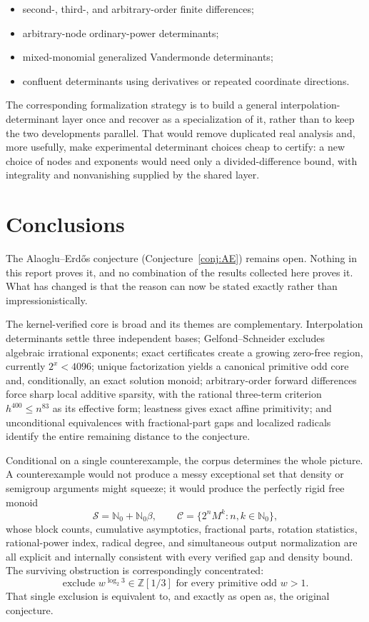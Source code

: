 \documentclass[11pt,oneside]{article}
\theoremstyle{definition}
\theoremstyle{remark}
\newcommand{\Nzero}{\mathbb N_0}
\newcommand{\Z}{\mathbb Z}
\newcommand{\Sol}{\mathcal S}
\newcommand{\Cand}{\mathcal C}
\newcommand{\Zthree}{\Z[1/3]}
\newcommand{\lean}[1]{\texttt{\detokenize{#1}}}
\begin{document}
\begin{itemize}
\item second-, third-, and arbitrary-order finite differences;
\item arbitrary-node ordinary-power determinants;
\item mixed-monomial generalized Vandermonde determinants;
\item confluent determinants using derivatives or repeated coordinate directions.
\end{itemize}

The corresponding formalization strategy is to build a general
interpolation-determinant layer once and recover \lean{HigherDifference} as a specialization
of it, rather than to keep the two developments parallel.  That would remove duplicated real
analysis and, more usefully, make experimental determinant choices cheap to certify: a new
choice of nodes and exponents would need only a divided-difference bound, with integrality
and nonvanishing supplied by the shared layer.

\section{Conclusions}
\label{sec:conclusion}

The Alaoglu--Erd\H{o}s conjecture (Conjecture~\ref{conj:AE}) remains open.  Nothing in this
report proves it, and no combination of the results collected here proves it.  What has
changed is that the reason can now be stated exactly rather than impressionistically.

The kernel-verified core is broad and its themes are complementary.  Interpolation
determinants settle three independent bases; Gelfond--Schneider excludes algebraic irrational
exponents; exact certificates create a growing zero-free region, currently $2^x<4096$;
unique factorization yields a canonical primitive odd core and, conditionally, an exact
solution monoid; arbitrary-order forward differences force sharp local additive sparsity,
with the rational three-term criterion $h^{400}\le n^{83}$ as its effective form; leastness
gives exact affine primitivity; and unconditional equivalences with fractional-part gaps and
localized radicals identify the entire remaining distance to the conjecture.

Conditional on a single counterexample, the corpus determines the whole picture.  A
counterexample would not produce a messy exceptional set that density or semigroup arguments
might squeeze; it would produce the perfectly rigid free monoid
\[
\Sol=\Nzero+\Nzero\beta,\qquad
\Cand=\{2^nM^k:n,k\in\Nzero\},
\]
whose block counts, cumulative asymptotics, fractional parts, rotation statistics,
rational-power index, radical degree, and simultaneous output normalization are all explicit
and internally consistent with every verified gap and density bound.  The surviving
obstruction is correspondingly concentrated:
\[
 \text{exclude }w^{\log_2 3}\in\Zthree
 \text{ for every primitive odd }w>1.
\]
That single exclusion is equivalent to, and exactly as open as, the original conjecture.
\end{document}

